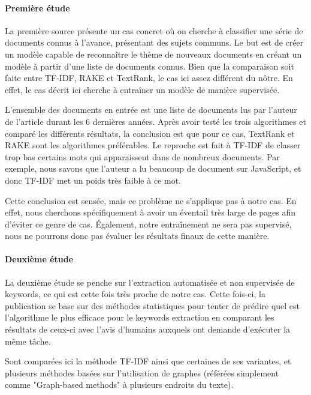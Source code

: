 			\paragraph{Première étude}
			
				La première source\cite{text-analysis-src4} présente un cas concret où on cherche à classifier une série de documents connus à l'avance, présentant des sujets communs. Le but est de créer un modèle capable de reconnaître le thème de nouveaux documents  en créant un modèle à partir d'une liste de documents connus. Bien que la comparaison soit faite entre TF-IDF, RAKE et TextRank, le cas ici assez différent du nôtre. En effet, le cas décrit ici cherche à entraîner un modèle de manière supervisée. 

				L'ensemble des documents en entrée est une liste de documents lus par l'auteur de l'article durant les 6 dernières années. Après avoir testé les trois algorithmes et comparé les différents résultats, la conclusion est que pour ce cas, TextRank et RAKE sont les algorithmes préférables. Le reproche est fait à TF-IDF de classer trop bas certains mots qui apparaissent dans de nombreux documents. Par exemple, nous savons que l'auteur a lu beaucoup de document sur JavaScript, et donc TF-IDF met un poids très faible à ce mot.

				Cette conclusion est sensée, mais ce problème ne s'applique pas à notre cas. En effet, nous cherchons spécifiquement à avoir un éventail très large de pages afin d'éviter ce genre de cas. Également, notre entraînement ne sera pas supervisé, nous ne pourrons donc pas évaluer les résultats finaux de cette manière.

			\paragraph{Deuxième étude}

				La deuxième étude\cite{text-analysis-src5} se penche sur l'extraction automatisée et non supervisée de keywords, ce qui est cette fois très proche de notre cas. Cette fois-ci, la publication se base sur des méthodes statistiques pour tenter de prédire quel est l'algorithme le plus efficace pour le keywords extraction en comparant les résultats de ceux-ci avec l'avis d'humains auxquels ont demande d'exécuter la même tâche.

				Sont comparées ici la méthode TF-IDF ainsi que certaines de ses variantes, et plusieurs méthodes basées sur l'utilisation de graphes (référées simplement comme "Graph-based methods" à plusieurs endroits du texte).

